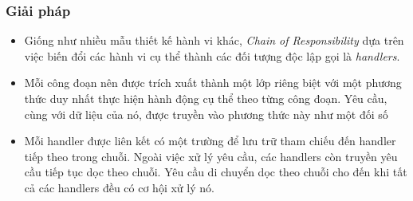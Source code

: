 \subsubsection{Giải pháp}
\begin{flushleft}
	\begin{itemize}
		\item Giống như nhiều mẫu thiết kế hành vi khác, \textit{Chain of Responsibility} dựa trên việc biến đổi các hành vi cụ thể thành các đối tượng độc lập gọi là \textit{handlers}.
		\item Mỗi công đoạn nên được trích xuất thành một lớp riêng biệt với một phương thức duy nhất thực hiện hành động cụ thể theo từng công đoạn. Yêu cầu, cùng với dữ liệu của nó, được truyền vào phương thức này như một đối số
		\item Mỗi handler được liên kết có một trường để lưu trữ tham chiếu đến handler tiếp theo trong chuỗi. Ngoài việc xử lý yêu cầu, các handlers còn truyền yêu cầu tiếp tục dọc theo chuỗi. Yêu cầu di chuyển dọc theo chuỗi cho đến khi tất cả các handlers đều có cơ hội xử lý nó.
	\end{itemize}
\end{flushleft}

